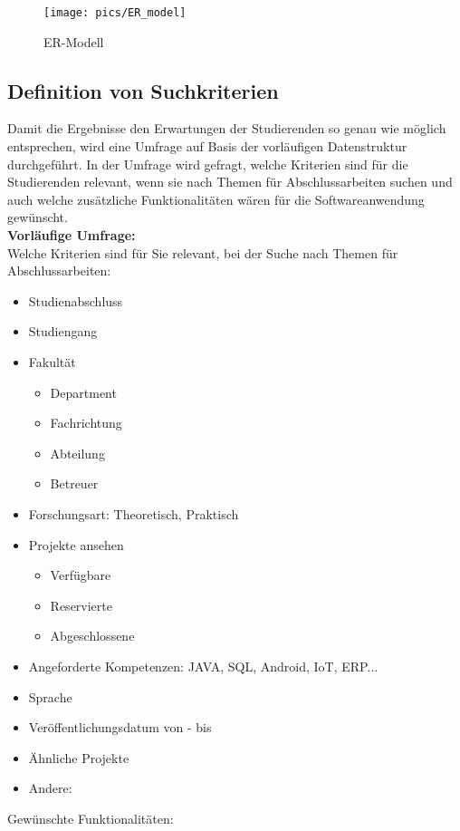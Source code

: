 \cleardoublepage
\begin{figure}[hp]%
    \centering
    \texttt{[image: pics/ER\_model]}\\
    \caption{ER-Modell}
\end{figure}


\subsection{Definition von Suchkriterien}
Damit die Ergebnisse den Erwartungen der Studierenden so genau wie möglich entsprechen, wird eine Umfrage auf Basis der vorläufigen Datenstruktur durchgeführt.
In der Umfrage wird gefragt, welche Kriterien sind für die Studierenden relevant, wenn sie nach Themen für Abschlussarbeiten suchen und auch welche zusätzliche Funktionalitäten wären für die Softwareanwendung gewünscht.\\

\newpage
\textbf{Vorläufige Umfrage:}\\

Welche Kriterien sind für Sie relevant, bei der Suche nach Themen für Abschlussarbeiten:
	
	\begin{itemize}
	\item Studienabschluss
	\item Studiengang
	\item Fakultät
		\begin{itemize}[noitemsep]
			\item Department
			\item Fachrichtung
			\item Abteilung
			\item Betreuer
		\end{itemize}
	\item Forschungsart: Theoretisch, Praktisch
	\item Projekte ansehen
		\begin{itemize}[noitemsep]
			\item Verfügbare
			\item Reservierte
			\item Abgeschlossene
		\end{itemize}
	\item Angeforderte Kompetenzen: JAVA, SQL, Android, IoT, ERP{...}
	\item Sprache
	\item Veröffentlichungsdatum von - bis
	\item Ähnliche Projekte
	\item Andere:
	\end{itemize}
Gewünschte Funktionalitäten:
	

